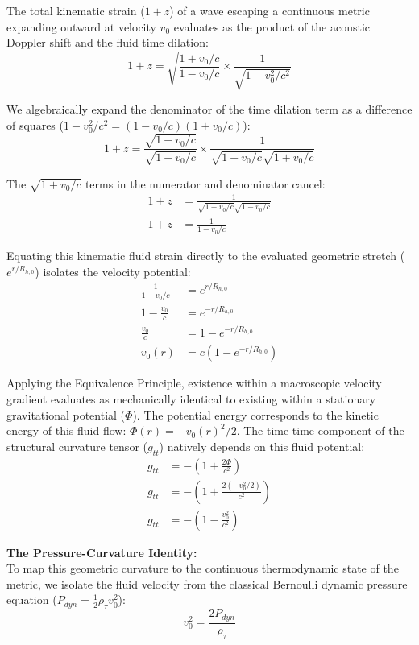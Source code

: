 \documentclass[11pt, a4paper]{article}
\begin{document}
The total kinematic strain ($1+z$) of a wave escaping a continuous metric expanding outward at velocity $v_0$ evaluates as the product of the acoustic Doppler shift and the fluid time dilation:
\begin{equation}
    1+z = \sqrt{\frac{1+v_0/c}{1-v_0/c}} \times \frac{1}{\sqrt{1-v_0^2/c^2}}
\end{equation}

We algebraically expand the denominator of the time dilation term as a difference of squares ($1-v_0^2/c^2 = (1-v_0/c)(1+v_0/c)$):
\begin{equation}
    1+z = \frac{\sqrt{1+v_0/c}}{\sqrt{1-v_0/c}} \times \frac{1}{\sqrt{1-v_0/c}\sqrt{1+v_0/c}}
\end{equation}

The $\sqrt{1+v_0/c}$ terms in the numerator and denominator cancel:
\begin{align}
    1+z &= \frac{1}{\sqrt{1-v_0/c}\sqrt{1-v_0/c}} \\
    1+z &= \frac{1}{1 - v_0/c}
\end{align}

Equating this kinematic fluid strain directly to the evaluated geometric stretch ($e^{r/R_{h,0}}$) isolates the velocity potential:
\begin{align}
    \frac{1}{1-v_0/c} &= e^{r/R_{h,0}} \\
    1-\frac{v_0}{c} &= e^{-r/R_{h,0}} \\
    \frac{v_0}{c} &= 1 - e^{-r/R_{h,0}} \\
    v_0(r) &= c\left(1 - e^{-r/R_{h,0}}\right)
\end{align}

Applying the Equivalence Principle, existence within a macroscopic velocity gradient evaluates as mechanically identical to existing within a stationary gravitational potential ($\Phi$). The potential energy corresponds to the kinetic energy of this fluid flow: $\Phi(r) = -v_0(r)^2/2$. The time-time component of the structural curvature tensor ($g_{tt}$) natively depends on this fluid potential:
\begin{align}
    g_{tt} &= -\left( 1 + \frac{2\Phi}{c^2} \right) \\
    g_{tt} &= -\left( 1 + \frac{2(-v_0^2/2)}{c^2} \right) \\
    g_{tt} &= -\left( 1 - \frac{v_0^2}{c^2} \right)
\end{align}

\textbf{The Pressure-Curvature Identity:} \\
To map this geometric curvature to the continuous thermodynamic state of the metric, we isolate the fluid velocity from the classical Bernoulli dynamic pressure equation ($P_{dyn} = \frac{1}{2}\rho_{\tau} v_0^2$):
\begin{equation}
    v_0^2 = \frac{2 P_{dyn}}{\rho_{\tau}}
\end{equation}
\end{document}

